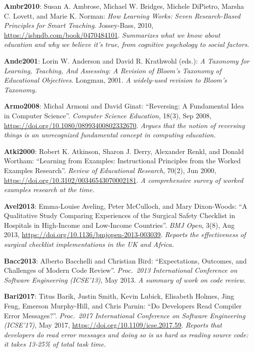 \textbf{\hypertarget{b:Ambr2010}{Ambr2010}\label{b:Ambr2010}}: Susan A. Ambrose, Michael W. Bridges, Michele DiPietro, Marsha C. Lovett, and Marie K. Norman: \emph{How Learning Works: Seven Research-Based Principles for Smart Teaching}. Jossey-Bass, 2010, \url{https://isbndb.com/book/0470484101}. \emph{Summarizes what we know about education and why we believe it's true, from cognitive psychology to social factors.}

\textbf{\hypertarget{b:Ande2001}{Ande2001}\label{b:Ande2001}}: Lorin W. Anderson and David R. Krathwohl (eds.): \emph{A Taxonomy for Learning, Teaching, And Assessing: A Revision of Bloom's Taxonomy of Educational Objectives}. Longman, 2001. \emph{A widely-used revision to Bloom's Taxonomy.}

\textbf{\hypertarget{b:Armo2008}{Armo2008}\label{b:Armo2008}}: Michal Armoni and David Ginat: ``Reversing: A Fundamental Idea in Computer Science''. \emph{Computer Science Education}, 18(3), Sep 2008, \url{https://doi.org/10.1080/08993400802332670}. \emph{Argues that the notion of reversing things is an unrecognized fundamental concept in computing education.}

\textbf{\hypertarget{b:Atki2000}{Atki2000}\label{b:Atki2000}}: Robert K. Atkinson, Sharon J. Derry, Alexander Renkl, and Donald Wortham: ``Learning from Examples: Instructional Principles from the Worked Examples Research''. \emph{Review of Educational Research}, 70(2), Jun 2000, \url{https://doi.org/10.3102/00346543070002181}. \emph{A comprehensive survey of worked examples research at the time.}

\textbf{\hypertarget{b:Avel2013}{Avel2013}\label{b:Avel2013}}: Emma-Louise Aveling, Peter McCulloch, and Mary Dixon-Woods: ``A Qualitative Study Comparing Experiences of the Surgical Safety Checklist in Hospitals in High-Income and Low-Income Countries''. \emph{BMJ Open}, 3(8), Aug 2013, \url{https://doi.org/10.1136/bmjopen-2013-003039}. \emph{Reports the effectiveness of surgical checklist implementations in the UK and Africa.}

\textbf{\hypertarget{b:Bacc2013}{Bacc2013}\label{b:Bacc2013}}: Alberto Bacchelli and Christian Bird: ``Expectations, Outcomes, and Challenges of Modern Code Review''. \emph{Proc.\ 2013 International Conference on Software Engineering (ICSE'13)}, May 2013. \emph{A summary of work on code review.}

\textbf{\hypertarget{b:Bari2017}{Bari2017}\label{b:Bari2017}}: Titus Barik, Justin Smith, Kevin Lubick, Elisabeth Holmes, Jing Feng, Emerson Murphy-Hill, and Chris Parnin: ``Do Developers Read Compiler Error Messages?''. \emph{Proc.\ 2017 International Conference on Software Engineering (ICSE'17)}, May 2017, \url{https://doi.org/10.1109/icse.2017.59}. \emph{Reports that developers do read error messages and doing so is as hard as reading source code: it takes 13-25\% of total task time.}

